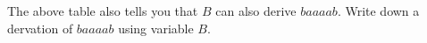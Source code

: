 The above table also tells you that $B$ can also derive $baaaab$.
Write down a dervation of $baaaab$ using variable $B$.
